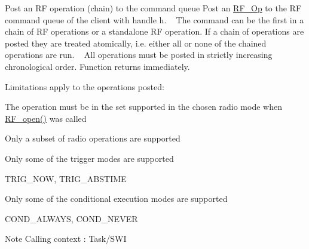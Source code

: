 Post an R\+F operation (chain) to the command queue Post an \hyperlink{_r_f_8h_a47ea3dea78019340e8f8ceb854de5f02}{R\+F\+\_\+\+Op} to the R\+F command queue of the client with handle h. ~\newline
 The command can be the first in a chain of R\+F operations or a standalone R\+F operation. If a chain of operations are posted they are treated atomically, i.\+e. either all or none of the chained operations are run. ~\newline
 All operations must be posted in strictly increasing chronological order. Function returns immediately. ~\newline
 

Limitations apply to the operations posted\+:
\begin{DoxyItemize}
\item The operation must be in the set supported in the chosen radio mode when \hyperlink{_r_f_8h_a13a7c6f5a2b797e0aac18fecfaba6f64}{R\+F\+\_\+open()} was called
\item Only a subset of radio operations are supported
\item Only some of the trigger modes are supported
\begin{DoxyItemize}
\item T\+R\+I\+G\+\_\+\+N\+O\+W, T\+R\+I\+G\+\_\+\+A\+B\+S\+T\+I\+M\+E
\end{DoxyItemize}
\item Only some of the conditional execution modes are supported
\begin{DoxyItemize}
\item C\+O\+N\+D\+\_\+\+A\+L\+W\+A\+Y\+S, C\+O\+N\+D\+\_\+\+N\+E\+V\+E\+R
\end{DoxyItemize}
\end{DoxyItemize}

\begin{DoxyNote}{Note}
Calling context \+: Task/\+S\+W\+I
\end{DoxyNote}

